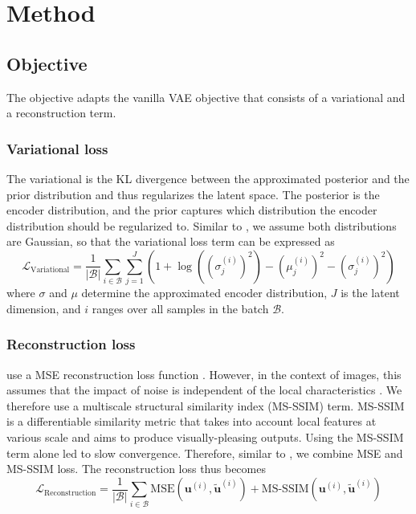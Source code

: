 \documentclass{article}
\begin{document}
\section{Method}
\subsection{Objective}
The objective adapts the vanilla VAE objective that consists of a variational and a reconstruction term.
\subsubsection{Variational loss}
The variational is the KL divergence between the approximated posterior and the prior distribution and thus regularizes the latent space. The posterior is the encoder distribution, and the prior captures which distribution the encoder distribution should be regularized to. Similar to \citet{kingma}, we assume both distributions are Gaussian, so that the variational loss term can be expressed as
\begin{equation}
  \mathcal{L}_{\text{Variational}}
    = \frac{1}{\left|\mathcal{B}\right|} \sum_{i \in \mathcal{B}} \sum_{j=1}^J \left(
      1
      + \log\left(
        \left(
          \sigma_j^{(i)}
        \right)^2
      \right)
      - \left(\mu_j^{(i)}\right)^2 
      - \left(\sigma_j^{(i)}\right)^2 
    \right)
\end{equation}
where $\sigma$ and $\mu$ determine the approximated encoder distribution, $J$ is the latent dimension, and $i$ ranges over all samples in the batch $\mathcal{B}$.
\subsubsection{Reconstruction loss}
\citet{kingma} use a MSE reconstruction loss function \citep{kingma}. However, in the context of images, this assumes that the impact of noise is independent of the local characteristics \citep{zhao2}. We therefore use a multiscale structural similarity index (MS-SSIM) term. MS-SSIM is a differentiable similarity metric that takes into account local features at various scale \citep{zhao2} and aims to produce visually-pleasing outputs. Using the MS-SSIM term alone led to slow convergence. Therefore, similar to \citet{zhao2}, we combine MSE and MS-SSIM loss. The reconstruction loss thus becomes
\begin{equation}
  \mathcal{L}_{\text{Reconstruction}}
    = \frac{1}{\left|\mathcal{B}\right|} \sum_{i \in \mathcal{B}}
    \text{MSE}\left(
      \mathbf{u}^{(i)},
      \mathbf{\tilde{u}}^{(i)}
    \right)
    + \text{MS-SSIM}\left(
      \mathbf{u}^{(i)},
      \mathbf{\tilde{u}}^{(i)}
    \right)
\end{equation}
\end{document}
